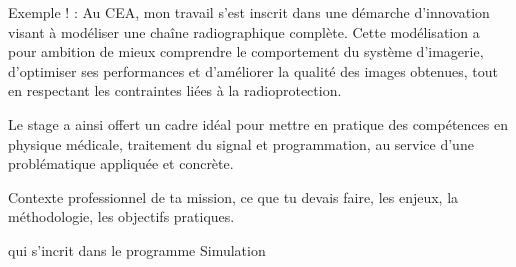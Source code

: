 \documentclass[12pt,a4paper]{report}
\begin{document}
Exemple ! : Au CEA, mon travail s'est inscrit dans une démarche d'innovation visant à modéliser une chaîne radiographique complète. Cette modélisation a pour ambition de mieux comprendre le comportement du système d'imagerie, d'optimiser ses performances et d'améliorer la qualité des images obtenues, tout en respectant les contraintes liées à la radioprotection.

Le stage a ainsi offert un cadre idéal pour mettre en pratique des compétences en physique médicale, traitement du signal et programmation, au service d'une problématique appliquée et concrète.


Contexte professionnel de ta mission, ce que tu devais faire, les enjeux, la méthodologie, les objectifs pratiques.

qui s'incrit dans le programme Simulation
\end{document}
